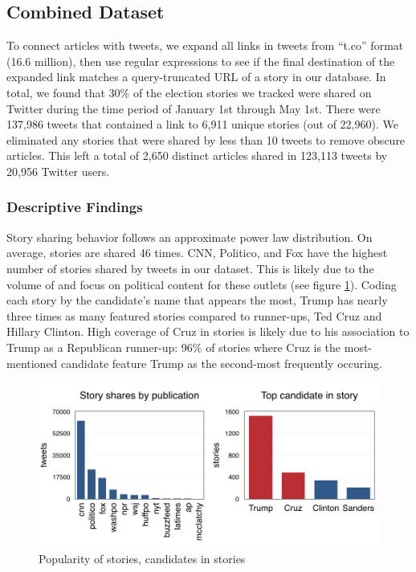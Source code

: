 \documentclass[letterpaper]{article}
\begin{document}
\subsection{Combined Dataset}
To connect articles with tweets, we expand all links in tweets from ``t.co'' format (16.6 million), then use regular expressions to see if the final destination of the expanded link matches a query-truncated URL of a story in our database. In total, we found that 30\% of the election stories we tracked were shared on Twitter during the time period of January 1st through May 1st. There were 137,986 tweets that contained a link to 6,911 unique stories (out of 22,960). We eliminated any stories that were shared by less than 10 tweets to remove obscure articles. This left a total of 2,650 distinct articles shared in 123,113 tweets by 20,956 Twitter users.

\subsubsection{Descriptive Findings}
Story sharing behavior follows an approximate power law distribution. On average, stories are shared 46 times. CNN, Politico, and Fox have the highest number of stories shared by tweets in our dataset. This is likely due to the volume of and focus on political content for these outlets (see figure \ref{fig:story-stats}). Coding each story by the candidate's name that appears the most, Trump has nearly three times as many featured stories compared to runner-ups, Ted Cruz and Hillary Clinton. High coverage of Cruz in stories is likely due to his association to Trump as a Republican runner-up: 96\% of stories where Cruz is the most-mentioned candidate feature Trump as the second-most frequently occuring.

\begin{figure}[t!]
\centering 
  \includegraphics[width=\linewidth]{story-stats-horizontal}  
  \caption{Popularity of stories, candidates in stories
    \label{fig:story-stats}}
\end{figure}  
\end{document}
